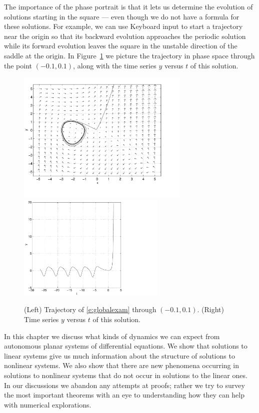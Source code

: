 \documentclass{ximera}
\begin{document}
The importance of the phase portrait is that it lets us determine the 
evolution of solutions starting in the square --- even though we do not 
have a formula for these solutions.  For example, we can use 
{\sf Keyboard input} to start a trajectory near the origin so
that its backward evolution
approaches the periodic solution
while its forward evolution leaves the square in the unstable
direction of the saddle at 
the origin.  In Figure~\ref{F:nltraj}
we picture the trajectory in phase space through the point 
$(-0.1,0.1)$, along with the time series $y$ versus $t$ of this
solution.  

\begin{figure}[htb]
           \centerline{%
	   \includegraphics[height=2.5in]{../figures/nltraj.pdf}
           \includegraphics[height=2.0in]{../figures/nlts.pdf}}
           \caption{(Left) Trajectory of \protect\eqref{e:globalexam} 
	through $(-0.1,0.1)$. (Right) Time series $y$ versus $t$ of
this solution.}
           \label{F:nltraj}
\end{figure}


In this chapter we discuss what kinds of dynamics we can expect
from autonomous planar systems of differential equations.  We 
show that solutions to linear systems give us much 
information about the structure of solutions to nonlinear 
systems.  We also show that there are new phenomena 
occurring in solutions to nonlinear systems that do not occur 
in solutions to the linear ones.  In our discussions we abandon 
any attempts at proofs; rather we try to survey the most 
important theorems with an eye to understanding how they can 
help with numerical explorations.



\end{document}
